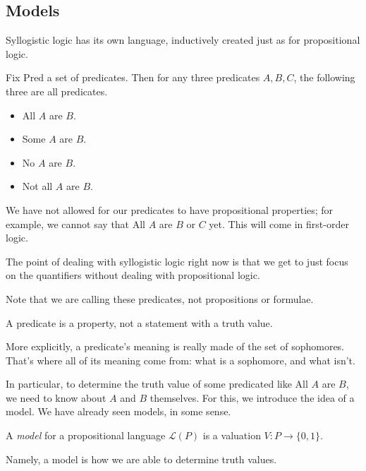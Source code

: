 \documentclass[../notes.tex]{subfiles}
\begin{document}
\subsection{Models}
Syllogistic logic has its own language, inductively created just as for propositional logic.
\begin{defi}
	Fix $\mathrm{Pred}$ a set of predicates. Then for any three predicates $A,B,C$, the following three are all predicates.
	\begin{itemize}
		\item \textrm{All $A$ are $B$}.
		\item \textrm{Some $A$ are $B$}.
		\item \textrm{No $A$ are $B$}.
		\item \textrm{Not all $A$ are $B$}.
	\end{itemize}
\end{defi}
\begin{remark}
	We have not allowed for our predicates to have propositional properties; for example, we cannot say that \textrm{All $A$ are $B$ or $C$} yet. This will come in first-order logic.
\end{remark}
\begin{remark}
	The point of dealing with syllogistic logic right now is that we get to just focus on the quantifiers without dealing with propositional logic.
\end{remark}
Note that we are calling these predicates, not propositions or formulae.
\begin{warn}
	A predicate is a property, not a statement with a truth value.
\end{warn}
More explicitly, a predicate's meaning is really made of the set of sophomores. That's where all of its meaning come from: what is a sophomore, and what isn't.

In particular, to determine the truth value of some predicated like \textrm{All $A$ are $B$}, we need to know about $A$ and $B$ themselves. For this, we introduce the idea of a model. We have already seen models, in some sense.
\begin{definition}[Model]
	A \textit{model} for a propositional language $\mathcal L(P)$ is a valuation $V:P\to\{0,1\}$.
\end{definition}
Namely, a model is how we are able to determine truth values.
\end{document}

